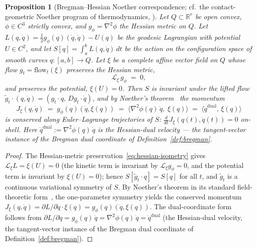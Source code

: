 \documentclass[11pt,a4paper]{article}
\theoremstyle{plain}
\newtheorem{proposition}[theorem]{Proposition}
\theoremstyle{definition}
\theoremstyle{remark}
\newcommand{\RR}{\mathbb{R}}
\begin{document}
\begin{proposition}[Bregman--Hessian Noether correspondence;
cf.\ the contact-geometric Noether program of thermodynamics,
\citet{bravetti2023noether}]
\label{prop:noether}
Let $Q \subset \RR^r$ be open convex, $\phi \in C^3$ strictly convex,
and $g_\phi = \nabla^2 \phi$ the Hessian metric on $Q$. Let
$L(q, \dot q) = \tfrac{1}{2} g_\phi(q)(\dot q, \dot q) - U(q)$ be the
geodesic Lagrangian with potential $U \in C^2$, and let
$S[q] = \int_a^b L(q, \dot q)\,dt$ be the action on the configuration
space of smooth curves $q : [a, b] \to Q$. Let $\xi$ be a complete
affine vector field on $Q$ whose flow $g_t = \mathrm{flow}_t(\xi)$
preserves the Hessian metric,
\begin{equation}\label{eq:hessian-isometry}
  \mathcal L_\xi\, g_\phi \;=\; 0,
\end{equation}
and preserves the potential, $\xi(U) = 0$. Then $S$ is invariant under
the lifted flow $\tilde g_t \cdot (q, \dot q) = (g_t \cdot q,\,
Dg_t \cdot \dot q)$, and by Noether's theorem~\cite{noether1918,olver1993}
the momentum
\begin{equation}\label{eq:noether-current}
  J_\xi(q, \dot q) \;=\; g_\phi(q)(\dot q, \xi(q)) \;=\;
  \bigl\langle \nabla^2\phi(q)\,\dot q,\; \xi(q)\bigr\rangle
  \;=\; \bigl\langle \dot q^{\mathrm{dual}},\, \xi(q)\bigr\rangle
\end{equation}
is conserved along Euler--Lagrange trajectories of $S$: $\frac{d}{dt}
J_\xi(q(t), \dot q(t)) = 0$ on-shell. Here
$\dot q^{\mathrm{dual}} := \nabla^2\phi(q)\,\dot q$ is the
Hessian-dual velocity --- the tangent-vector instance of the Bregman
dual coordinate of Definition~\ref{def:bregman}.
\end{proposition}

\begin{proof}
The Hessian-metric preservation~\eqref{eq:hessian-isometry} gives
$\mathcal L_\xi L = \xi(U) = 0$ (the kinetic term is invariant by
$\mathcal L_\xi g_\phi = 0$, and the potential term is invariant by
$\xi(U) = 0$); hence $S[\tilde g_t \cdot q] = S[q]$ for all $t$, and
$\tilde g_t$ is a continuous variational symmetry of $S$. By
Noether's theorem in its standard field-theoretic form~\cite{olver1993},
the one-parameter symmetry yields the conserved momentum
$J_\xi(q, \dot q) = \partial L / \partial \dot q \cdot \xi(q) =
g_\phi(q)(\dot q, \xi(q))$. The dual-coordinate form follows from
$\partial L/\partial\dot q = g_\phi(q)\,\dot q =
\nabla^2\phi(q)\,\dot q = \dot q^{\mathrm{dual}}$ (the Hessian-dual
velocity, the tangent-vector instance of the Bregman dual
coordinate of Definition~\ref{def:bregman}).
\end{proof}
\end{document}
